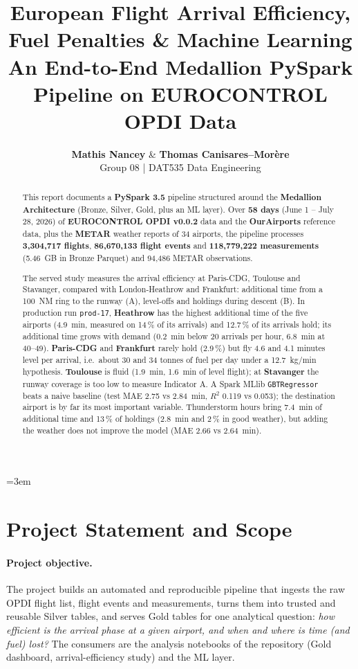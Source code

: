 \documentclass[11pt,a4paper]{article}
\title{\textbf{European Flight Arrival Efficiency, Fuel Penalties \& Machine Learning}\\[0.4em]
\large An End-to-End Medallion PySpark Pipeline on EUROCONTROL OPDI Data}
\author{\textbf{Mathis Nancey} \quad \& \quad \textbf{Thomas Canisares--Morère}\\
\small Group 08 \quad | \quad DAT535 Data Engineering}
\date{}
\begin{document}
\emergencystretch=3em

\maketitle

\begin{abstract}
This report documents a \textbf{PySpark 3.5} pipeline structured around the \textbf{Medallion Architecture} (Bronze, Silver, Gold, plus an ML layer). Over \textbf{58 days} (June 1 -- July 28, 2026) of \textbf{EUROCONTROL OPDI v0.0.2} data and the \textbf{OurAirports} reference data, plus the \textbf{METAR} weather reports of 34 airports, the pipeline processes \textbf{3,304,717 flights}, \textbf{86,670,133 flight events} and \textbf{118,779,222 measurements} (5.46~GB in Bronze Parquet) and 94,486 METAR observations.

The served study measures the arrival efficiency at Paris-CDG, Toulouse and Stavanger, compared with London-Heathrow and Frankfurt: additional time from a 100~NM ring to the runway (A), level-offs and holdings during descent (B). In production run \texttt{prod-17}, \textbf{Heathrow} has the highest additional time of the five airports (4.9~min, measured on 14\,\% of its arrivals) and 12.7\,\% of its arrivals hold; its additional time grows with demand (0.2~min below 20 arrivals per hour, 6.8~min at 40--49). \textbf{Paris-CDG} and \textbf{Frankfurt} rarely hold (2.9\,\%) but fly 4.6 and 4.1 minutes level per arrival, i.e.\ about 30 and 34 tonnes of fuel per day under a 12.7~kg/min hypothesis. \textbf{Toulouse} is fluid (1.9~min, 1.6~min of level flight); at \textbf{Stavanger} the runway coverage is too low to measure Indicator A. A Spark MLlib \texttt{GBTRegressor} beats a naive baseline (test MAE 2.75 vs 2.84~min, $R^2$ 0.119 vs 0.053); the destination airport is by far its most important variable. Thunderstorm hours bring 7.4~min of additional time and 13\,\% of holdings (2.8~min and 2\,\% in good weather), but adding the weather does not improve the model (MAE 2.66 vs 2.64~min).
\end{abstract}

\section{Project Statement and Scope}

\paragraph{Project objective.}
The project builds an automated and reproducible pipeline that ingests the raw OPDI flight list, flight events and measurements, turns them into trusted and reusable Silver tables, and serves Gold tables for one analytical question: \emph{how efficient is the arrival phase at a given airport, and when and where is time (and fuel) lost?} The consumers are the analysis notebooks of the repository (Gold dashboard, arrival-efficiency study) and the ML layer.
\end{document}
